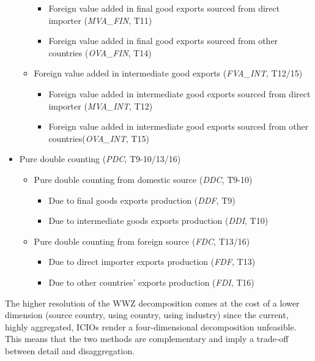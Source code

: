 \documentclass[a4paper]{article}\usepackage[]{graphicx}\usepackage[]{color}
\begin{document}
\begin{itemize}
\begin{itemize}
\begin{itemize}
\item Foreign value added in final good exports sourced from direct importer
(\textit{MVA\_FIN}, T11) 
\item Foreign value added in final good exports sourced from other countries
(\textit{OVA\_FIN}, T14) 
\end{itemize}
\item Foreign value added in intermediate good exports (\textit{FVA\_INT},
T12/15) 

\begin{itemize}
\item Foreign value added in intermediate good exports sourced from direct
importer (\textit{MVA\_INT}, T12) 
\item Foreign value added in intermediate good exports sourced from other
countries(\textit{OVA\_INT}, T15) 
\end{itemize}
\end{itemize}
\item Pure double counting (\textit{PDC}, T9-10/13/16) 

\begin{itemize}
\item Pure double counting from domestic source (\textit{DDC}, T9-10) 

\begin{itemize}
\item Due to final goods exports production (\textit{DDF}, T9) 
\item Due to intermediate goods exports production (\textit{DDI}, T10) 
\end{itemize}
\item Pure double counting from foreign source (\textit{FDC}, T13/16) 

\begin{itemize}
\item Due to direct importer exports production (\textit{FDF}, T13) 
\item Due to other countries' exports production (\textit{FDI}, T16) 
\end{itemize}
\end{itemize}
\end{itemize}
The higher resolution of the WWZ decomposition comes at the cost of
a lower dimension (source country, using country, using industry)
since the current, highly aggregated, ICIOs render a four-dimensional
decomposition unfeasible. This means that the two methods are complementary
and imply a trade-off between detail and disaggregation.
\end{document}
